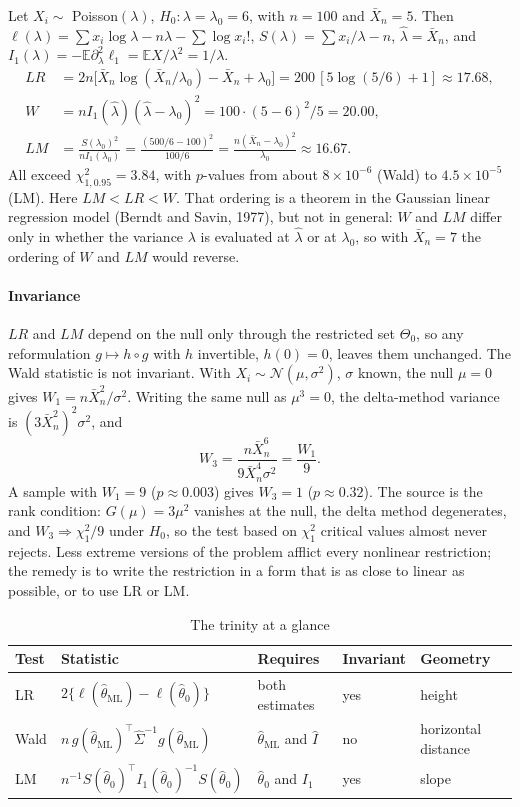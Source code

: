 \documentclass[11pt,a4paper]{article}
\newcommand{\E}{\mathbb{E}}
\newcommand{\N}{\mathcal{N}}
\newcommand{\cd}{\Rightarrow}
\newcommand{\Xbar}{\bar X_n}
\newcommand{\thml}{\hat\theta_{\mathrm{ML}}}
\begin{document}
\begin{example}[Poisson]\label{ex:poisson}
Let $X_i\sim$ Poisson$(\lambda)$, $H_0:\lambda=\lambda_0=6$, with $n=100$ and $\Xbar=5$. Then $\ell(\lambda)=\sum x_i\log\lambda-n\lambda-\sum\log x_i!$, $S(\lambda)=\sum x_i/\lambda-n$, $\hat\lambda=\Xbar$, and $I_1(\lambda)=-\E\partial^2_\lambda\ell_1=\E X/\lambda^2=1/\lambda$.
\[
\begin{aligned}
LR&=2n\big[\Xbar\log(\Xbar/\lambda_0)-\Xbar+\lambda_0\big]=200\,[5\log(5/6)+1]\approx17.68,\\
W&=nI_1(\hat\lambda)(\hat\lambda-\lambda_0)^2=100\cdot(5-6)^2/5=20.00,\\
LM&=\frac{S(\lambda_0)^2}{nI_1(\lambda_0)}=\frac{(500/6-100)^2}{100/6}=\frac{n(\Xbar-\lambda_0)^2}{\lambda_0}\approx16.67 .
\end{aligned}
\]
All exceed $\chi^2_{1,0.95}=3.84$, with $p$-values from about $8\times10^{-6}$ (Wald) to $4.5\times10^{-5}$ (LM). Here $LM<LR<W$. That ordering is a theorem in the Gaussian linear regression model (Berndt and Savin, 1977), but not in general: $W$ and $LM$ differ only in whether the variance $\lambda$ is evaluated at $\hat\lambda$ or at $\lambda_0$, so with $\Xbar=7$ the ordering of $W$ and $LM$ would reverse.
\end{example}

\paragraph{Invariance}
$LR$ and $LM$ depend on the null only through the restricted set $\Theta_0$, so any reformulation $g\mapsto h\circ g$ with $h$ invertible, $h(0)=0$, leaves them unchanged. The Wald statistic is not invariant. With $X_i\sim\N(\mu,\sigma^2)$, $\sigma$ known, the null $\mu=0$ gives $W_1=n\Xbar^2/\sigma^2$. Writing the same null as $\mu^3=0$, the delta-method variance is $(3\Xbar^2)^2\sigma^2$, and
\[
W_3=\frac{n\Xbar^6}{9\Xbar^4\sigma^2}=\frac{W_1}{9}.
\]
A sample with $W_1=9$ ($p\approx0.003$) gives $W_3=1$ ($p\approx0.32$). The source is the rank condition: $G(\mu)=3\mu^2$ vanishes at the null, the delta method degenerates, and $W_3\cd\chi^2_1/9$ under $H_0$, so the test based on $\chi^2_1$ critical values almost never rejects. Less extreme versions of the problem afflict every nonlinear restriction; the remedy is to write the restriction in a form that is as close to linear as possible, or to use LR or LM.

\begin{table}[h]
\centering\small
\caption{The trinity at a glance}\label{tab:trinity}
\begin{tabular}{@{}lllll@{}}
\toprule
Test & Statistic & Requires & Invariant & Geometry\\
\midrule
LR & $2\{\ell(\thml)-\ell(\hat\theta_0)\}$ & both estimates & yes & height\\
Wald & $n\,g(\thml)^\top\hat\Sigma^{-1}g(\thml)$ & $\thml$ and $\hat I$ & no & horizontal distance\\
LM & $n^{-1}S(\hat\theta_0)^\top I_1(\hat\theta_0)^{-1}S(\hat\theta_0)$ & $\hat\theta_0$ and $I_1$ & yes & slope\\
\bottomrule
\end{tabular}
\end{table}
\end{document}
